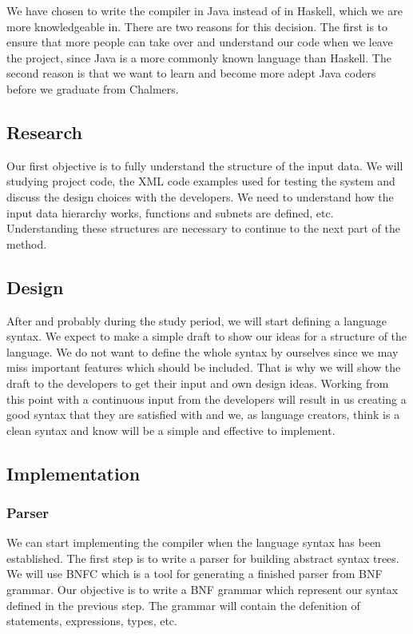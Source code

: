 \documentclass[a4paper]{article}
\begin{document}
{We have chosen to write the compiler in Java instead of in Haskell,
which we are more knowledgeable in. There are two reasons for this
decision. The first is to ensure that more people can take over and
understand our code when we leave the project, since Java is a more
commonly known language than Haskell. The second reason is that we
want to learn and become more adept Java coders before we graduate
from Chalmers.


\subsection{Research}
Our first objective is to fully understand the structure of the input
data. We will studying project code, the XML code examples used for
testing the system and discuss the design choices with the
developers. We need to understand how the input data hierarchy works,
functions and subnets are defined, etc. Understanding these structures
are necessary to continue to the next part of the method.

\subsection{Design}
After and probably during the study period, we will start defining a
language syntax. We expect to make a simple draft to show our ideas
for a structure of the language. We do not want to define the whole
syntax by ourselves since we may miss important features which should
be included. That is why we will show the draft to the developers to
get their input and own design ideas. Working from this point with a
continuous input from the developers will result in us creating a good
syntax that they are satisfied with and we, as language creators,
think is a clean syntax and know will be a simple and effective to
implement.

\subsection{Implementation}
\subsubsection{Parser}
We can start implementing the compiler when the language syntax has
been established. The first step is to write a parser for building
abstract syntax trees. We will use BNFC which is a tool for generating
a finished parser from BNF grammar. Our objective is to write a BNF
grammar which represent our syntax defined in the previous step. The
grammar will contain the defenition of statements, expressions, types,
etc.

}
\end{document}
